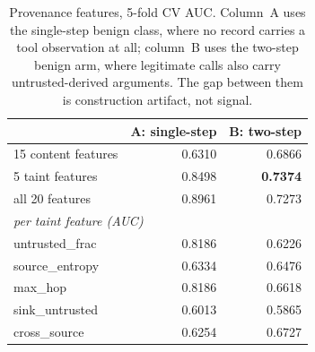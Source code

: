\begin{table}[!htbp]
\centering\small
\setlength{\tabcolsep}{4pt}
\caption{Provenance features, 5-fold CV AUC. Column~A uses the
single-step benign class, where no record carries a tool observation
at all; column~B uses the two-step benign arm, where legitimate calls
also carry untrusted-derived arguments. The gap between them is
construction artifact, not signal.}
\label{tab:taint}
\begin{tabular}{lrr}
\toprule
 & A: single-step & B: two-step \\
\midrule
15 content features      & 0.6310 & 0.6866 \\
5 taint features         & 0.8498 & \textbf{0.7374} \\
all 20 features          & 0.8961 & 0.7273 \\
\midrule
\multicolumn{3}{l}{\emph{per taint feature (AUC)}} \\
\quad untrusted\_frac    & 0.8186 & 0.6226 \\
\quad source\_entropy    & 0.6334 & 0.6476 \\
\quad max\_hop           & 0.8186 & 0.6618 \\
\quad sink\_untrusted    & 0.6013 & 0.5865 \\
\quad cross\_source      & 0.6254 & 0.6727 \\
\bottomrule
\end{tabular}
\end{table}
